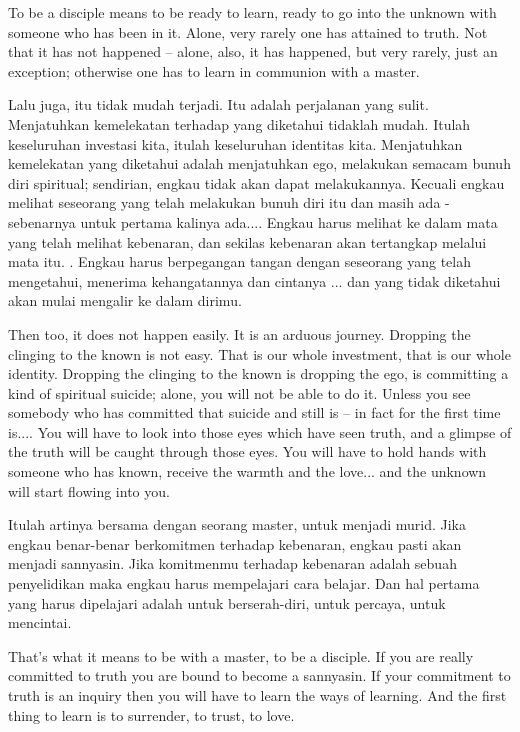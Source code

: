 \english
To be a disciple means to be ready to learn, ready to go into the unknown with someone who has been in it. Alone, very rarely one has attained to truth. Not that it has not happened -- alone, also, it has happened, but very rarely, just an exception; otherwise one has to learn in communion with a master.

\bahasa
Lalu juga, itu tidak mudah terjadi. Itu adalah perjalanan yang sulit. Menjatuhkan kemelekatan terhadap yang diketahui tidaklah mudah. Itulah keseluruhan investasi kita, itulah keseluruhan identitas kita. Menjatuhkan kemelekatan yang diketahui adalah menjatuhkan ego, melakukan semacam bunuh diri spiritual; sendirian, engkau tidak akan dapat melakukannya. Kecuali engkau melihat seseorang yang telah melakukan bunuh diri itu dan masih ada - sebenarnya untuk pertama kalinya ada.... Engkau harus melihat ke dalam mata yang telah melihat kebenaran, dan sekilas kebenaran akan tertangkap melalui mata itu. . Engkau harus berpegangan tangan dengan seseorang yang telah mengetahui, menerima kehangatannya dan cintanya ... dan yang tidak diketahui akan mulai mengalir ke dalam dirimu.

\english
Then too, it does not happen easily. It is an arduous journey. Dropping the clinging to the known is not easy. That is our whole investment, that is our whole identity. Dropping the clinging to the known is dropping the ego, is committing a kind of spiritual suicide; alone, you will not be able to do it. Unless you see somebody who has committed that suicide and still is -- in fact for the first time is.... You will have to look into those eyes which have seen truth, and a glimpse of the truth will be caught through those eyes. You will have to hold hands with someone who has known, receive the warmth and the love... and the unknown will start flowing into you.

\bahasa
Itulah artinya bersama dengan seorang master, untuk menjadi murid. Jika engkau benar-benar berkomitmen terhadap kebenaran, engkau pasti akan menjadi sannyasin. Jika komitmenmu terhadap kebenaran adalah sebuah penyelidikan maka engkau harus mempelajari cara belajar. Dan hal pertama yang harus dipelajari adalah untuk berserah-diri, untuk percaya, untuk mencintai.

\english
That's what it means to be with a master, to be a disciple. If you are really committed to truth you are bound to become a sannyasin. If your commitment to truth is an inquiry then you will have to learn the ways of learning. And the first thing to learn is to surrender, to trust, to love.

